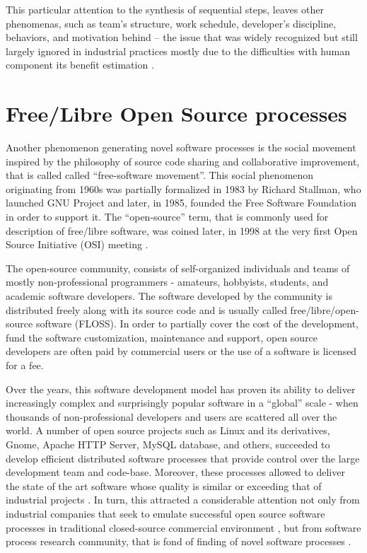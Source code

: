 This particular attention to the synthesis of sequential steps, leaves other phenomenas, 
such as team's structure, work schedule, developer's discipline, behaviors, and motivation behind -- 
the issue that was widely recognized \cite{citeulike:149387} \cite{citeulike:113403} 
\cite{citeulike:205322} \cite{citeulike:12798652} but still largely ignored in industrial practices 
mostly due to the  difficulties with human component its benefit estimation 
\cite{citeulike:12798659} \cite{citeulike:12798662} \cite{csdl2-12-11}.

%
%
\section{Free/Libre Open Source processes}\label{floss_processes}
Another phenomenon generating novel software processes is the social movement inspired by the philosophy 
of source code sharing and collaborative improvement, that is called called ``free-software movement''. 
This social phenomenon originating from 1960s was partially formalized in 1983 by Richard Stallman,
who launched GNU Project and later, in 1985, founded the Free Software Foundation in order to support 
it. The ``open-source'' term, that is commonly used for description of free/libre software, 
was coined later, in 1998 at the very first Open Source Initiative (OSI) meeting \cite{osi-history}.

The open-source community, consists of self-organized individuals and teams of mostly non-professional 
programmers - amateurs, hobbyists, students, and academic software developers. The software 
developed by the community is distributed freely along with its source code and is usually called 
free/libre/open-source software (FLOSS). 
In order to partially cover the cost of the development, fund the software customization, maintenance 
and support, open source developers are often paid by commercial users or the use of a software is 
licensed for a fee.

Over the years, this software development model has proven its ability to deliver increasingly complex 
and surprisingly popular software in a ``global'' scale - when thousands of non-professional developers 
and users are scattered all over the world. A number of open source projects such as Linux and its 
derivatives, Gnome, Apache HTTP Server, MySQL database, and others, succeeded to develop efficient 
distributed software processes that provide control over the large development team and code-base.
Moreover, these processes allowed to deliver the state of the art software whose quality is similar 
or exceeding that of industrial projects \cite{coverity2012}. 
In turn, this attracted a considerable attention not only from industrial companies that seek to emulate 
successful open source software processes in traditional closed-source commercial environment 
\cite{oss_virtual_organizations} \cite{oss_balance} \cite{oss_hp} \cite{oss_4industry}, 
but from software process research community, that is fond of finding of novel software processes
\cite{citeulike:12550640} \cite{citeulike:5043664} \cite{citeulike:5128808} \cite{citeulike:10377366}.

